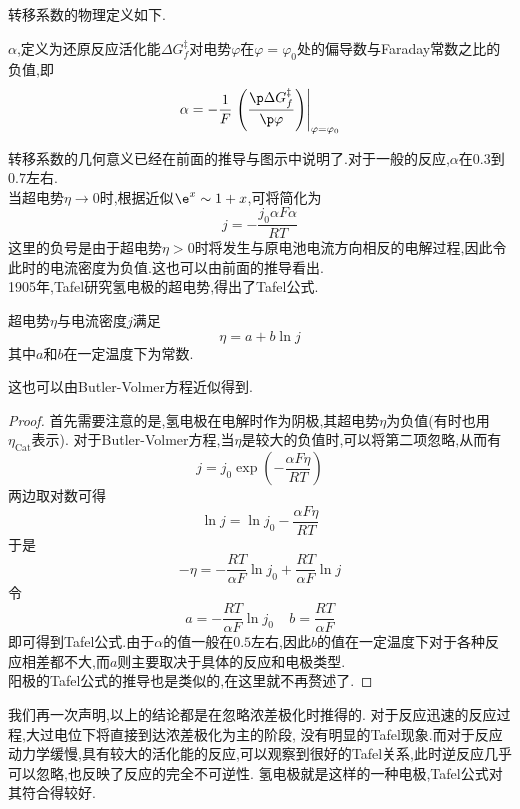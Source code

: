 \documentclass{ctexart}
\begin{document}
转移系数的物理定义如下.
\begin{definition}[6E.2.2 转移系数]
    $\alpha$,定义为还原反应活化能$\Delta G_{f}^\ddagger$对电势$\varphi$在$\varphi=\varphi_0$处的偏导数与Faraday常数之比的负值,即
    \[\alpha=-\dfrac{1}{F}\left.\left(\dfrac{\p\Delta G_{f}^\ddagger}{\p\varphi}\right)\right|_{\varphi=\varphi_0}\]

\end{definition}
转移系数的几何意义已经在前面的推导与图示中说明了.对于一般的反应,$\alpha$在$0.3$到$0.7$左右.\\
\indent 当超电势$\eta\to0$时,根据近似$\e^x\sim 1+x$,可将简化为
\[j=-\dfrac{j_0\alpha F\alpha}{RT}\]
这里的负号是由于超电势$\eta>0$时将发生与原电池电流方向相反的电解过程,因此令此时的电流密度为负值.这也可以由前面的推导看出.\vspace{4pt}\\
\indent 1905年,Tafel研究氢电极的超电势,得出了Tafel公式.
\begin{theorem}[6E.2.3 Tafel公式]
    超电势$\eta$与电流密度$j$满足
    \[\eta=a+b\ln j\]
    其中$a$和$b$在一定温度下为常数.
\end{theorem}
这也可以由Butler-Volmer方程近似得到.
\begin{proof}
    首先需要注意的是,氢电极在电解时作为阴极,其超电势$\eta$为负值(有时也用$\eta_{\text{Cat}}$表示).%
    对于Butler-Volmer方程,当$\eta$是较大的负值时,可以将第二项忽略,从而有
    \[j=j_0\exp\left(-\dfrac{\alpha F\eta}{RT}\right)\]
    两边取对数可得
    \[\ln j=\ln j_0-\dfrac{\alpha F\eta}{RT}\]
    于是
    \[-\eta=-\dfrac{RT}{\alpha F}\ln j_0+\dfrac{RT}{\alpha F}\ln j\]
    令
    \[a=-\dfrac{RT}{\alpha F}\ln j_0\ \ \ \ \ b=\dfrac{RT}{\alpha F}\]
    即可得到Tafel公式.由于$\alpha$的值一般在$0.5$左右,因此$b$的值在一定温度下对于各种反应相差都不大,而$a$则主要取决于具体的反应和电极类型.\\
    阳极的Tafel公式的推导也是类似的,在这里就不再赘述了.
\end{proof}
我们再一次声明,以上的结论都是在忽略浓差极化时推得的.%
对于反应迅速的反应过程,大过电位下将直接到达浓差极化为主的阶段,%
没有明显的Tafel现象.而对于反应动力学缓慢,具有较大的活化能的反应,可以观察到很好的Tafel关系,此时逆反应几乎可以忽略,也反映了反应的完全不可逆性.%
氢电极就是这样的一种电极,Tafel公式对其符合得较好.
\end{document}
